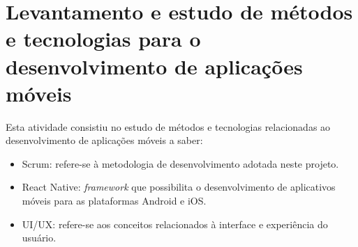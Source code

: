 






\section{Levantamento e estudo de métodos e tecnologias para o desenvolvimento de aplicações móveis}


Esta atividade consistiu no estudo de métodos e tecnologias relacionadas ao desenvolvimento de aplicações móveis a saber: 

\begin{itemize}

    \item Scrum: refere-se à metodologia de desenvolvimento adotada neste projeto.
  
    \item React Native: \textit{framework} que possibilita o desenvolvimento de aplicativos móveis para as plataformas Android e iOS.
    
    \item UI/UX: refere-se aos conceitos relacionados à interface e experiência do usuário.
    
\end{itemize}

